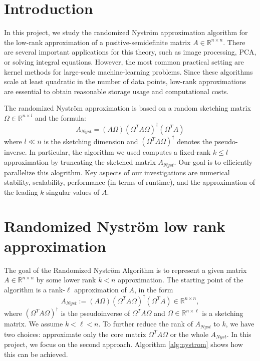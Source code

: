 \documentclass[a4paper, 12pt,oneside]{article}
\begin{document}
 
	 
	\clearpage
	\tableofcontents
	\thispagestyle{empty}
	\clearpage
	\setcounter{page}{1}

	\section{Introduction}
	In this project, we study the randomized Nyström approximation algorithm for the low-rank approximation of a positive-semidefinite matrix $A \in \mathbb{R}^{n \times n}$. There are several important applications for this theory, such as image processing, PCA, or solving integral equations. However, the most common practical setting are kernel methods for large-scale machine-learning problems. Since these algorithms scale at least quadratic in the number of data points, low-rank approximations are essential to obtain reasonable storage usage and computational costs.
	
	The randomized Nyström approximation is based on a random sketching matrix $\Omega \in \mathbb{R}^{n \times l}$ and the formula:
	\begin{equation*}
	A_{N y s t}=(A \Omega)\left(\Omega^T A \Omega\right)^{\dagger}\left(\Omega^T A\right)
	\end{equation*}
	where $l \ll n$ is the sketching dimension and $\left(\Omega^T A \Omega\right)^{\dagger}$ denotes the pseudo-inverse. In particular, the algorithm we used computes a fixed-rank $k \leq l$ approximation by truncating the sketched matrix $A_{N y s t}$. Our goal is to efficiently parallelize this alogrithm. Key aspects of our investigations are numerical stability, scalability, performance (in terms of runtime), and the approximation of the leading $k$ singular values of $A$.
	\section{Randomized Nyström low rank approximation}
	The goal of the Randomized Nystr\"om Algorithm is to represent a given matrix $A \in \mathbb{R}^{n \times n}$ by some lower rank $k<n$ approximation. The starting point of the algorithm is a rank-$\ell$ approximation of $A$, in the form
	\[
	A_{Nyst} := (A\Omega)(\Omega^T A \Omega)^{\dagger}(\Omega^T A) \in \mathbb{R}^{n \times n},
	\]
	where $(\Omega^T A \Omega)^\dagger$ is the pseudoinverse of $\Omega^T A \Omega$ and $\Omega \in \mathbb{R}^{n \times \ell}$ is a sketching matrix. We assume $k < \ell < n$. To further reduce the rank of $A_{Nyst}$ to $k$, we have two choices: approximate only the core matrix $\Omega^T A \Omega$ or the whole $A_{Nyst}$. In this project, we focus on the second approach. Algorithm \ref{alg:nystrom} shows how this can be achieved.
\end{document}
